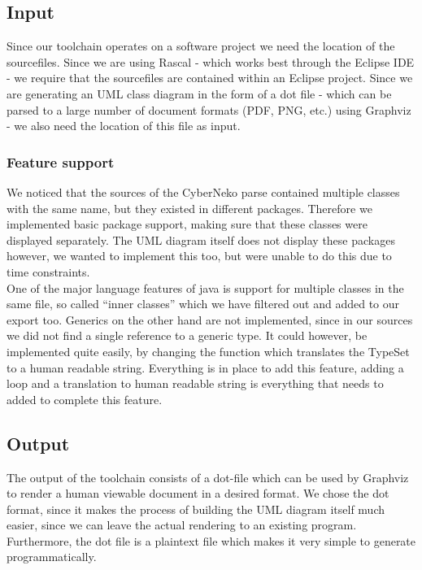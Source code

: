\documentclass[a4paper,twoside,11pt]{article}
\begin{document}
\subsection{Input}
\label{sec:input}
Since our toolchain operates on a software project we need the location of the sourcefiles. Since we are using Rascal - which works best through the Eclipse IDE\cite{url:eclipse} - we require that the sourcefiles are contained within an Eclipse project. Since we are generating an UML class diagram in the form of a dot file - which can be parsed to a large number of document formats (PDF, PNG, etc.) using Graphviz\cite{url:graphviz} - we also need the location of this file as input.

\subsubsection{Feature support}
\label{sec:featuresupport}
We noticed that the sources of the CyberNeko parse contained multiple classes with the same name, but they existed in different packages. Therefore we implemented basic package support, making sure that these classes were displayed separately. The UML diagram itself does not display these packages however, we wanted to implement this too, but were unable to do this due to time constraints. \\

One of the major language features of java is support for multiple classes in the same file, so called ``inner classes'' which we have filtered out and added to our export too. Generics on the other hand are not implemented, since in our sources we did not find a single reference to a generic type. It could however, be implemented quite easily, by changing the function which translates the TypeSet to a human readable string. Everything is in place to add this feature, adding a loop and a translation to human readable string is everything that needs to added to complete this feature.

\subsection{Output}
\label{sec:output}
The output of the toolchain consists of a dot-file which can be used by Graphviz\cite{url:graphviz} to render a human viewable document in a desired format. We chose the dot format, since it makes the process of building the UML diagram itself much easier, since we can leave the actual rendering to an existing program. Furthermore, the dot file is a plaintext file which makes it very simple to generate programmatically. \\
\end{document}
